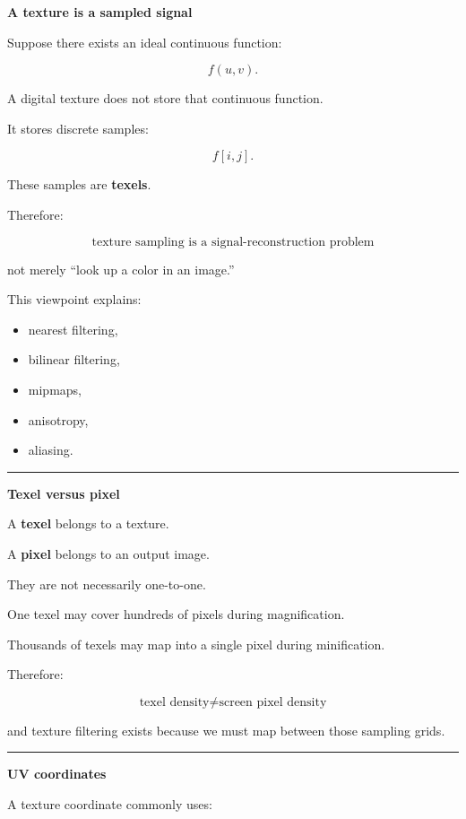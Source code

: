\textbf{A texture is a sampled signal}

Suppose there exists an ideal continuous function:

\[
f(u,v).
\]

A digital texture does not store that continuous function.

It stores discrete samples:

\[
f[i,j].
\]

These samples are \textbf{texels}.

Therefore:

\[
\boxed{
\text{texture sampling is a signal-reconstruction problem}
}
\]

not merely ``look up a color in an image.''

This viewpoint explains:

\begin{itemize}
\tightlist
\item
  nearest filtering,
\item
  bilinear filtering,
\item
  mipmaps,
\item
  anisotropy,
\item
  aliasing.
\end{itemize}

\begin{center}\rule{0.5\linewidth}{0.5pt}\end{center}

\textbf{Texel versus pixel}

A \textbf{texel} belongs to a texture.

A \textbf{pixel} belongs to an output image.

They are not necessarily one-to-one.

One texel may cover hundreds of pixels during magnification.

Thousands of texels may map into a single pixel during minification.

Therefore:

\[
\boxed{
\text{texel density}
\neq
\text{screen pixel density}
}
\]

and texture filtering exists because we must map between those sampling grids.

\begin{center}\rule{0.5\linewidth}{0.5pt}\end{center}

\textbf{UV coordinates}

A texture coordinate commonly uses:

